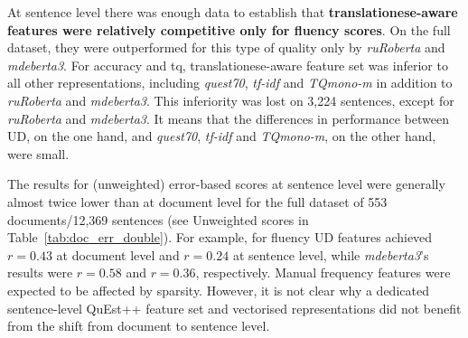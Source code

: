 At sentence level there was enough data to establish that \textbf{translationese-aware features were relatively competitive only for fluency scores}. On the full dataset, they were outperformed for this type of quality only by \textit{ruRoberta} and \textit{mdeberta3}. For accuracy and tq, translationese-aware feature set was inferior to all other representations, including \textit{quest70}, \textit{tf-idf} and \textit{TQmono-m} in addition to \textit{ruRoberta} and \textit{mdeberta3}. This inferiority was lost on 3,224 sentences, except for \textit{ruRoberta} and \textit{mdeberta3}. It means that the differences in performance between UD, on the one hand, and \textit{quest70}, \textit{tf-idf} and \textit{TQmono-m}, on the other hand, were small. 

\label{pg:downward_slide}
The results for (unweighted) error-based scores at sentence level were generally almost twice lower than at document level for the full dataset of 553 documents/12,369 sentences (see Unweighted scores in Table~\ref{tab:doc_err_double}). For example, for fluency UD features achieved $r=0.43$ at document level and $r=0.24$ at sentence level, while \textit{mdeberta3}'s results were $r=0.58$ and $r=0.36$, respectively. Manual frequency features were expected to be affected by sparsity. However, it is not clear why a dedicated sentence-level QuEst++ feature set and vectorised representations did not benefit from the shift from document to sentence level.

